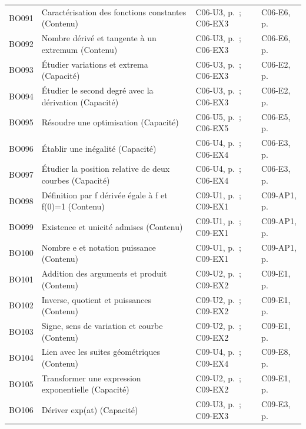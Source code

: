 \begin{longtable}{p{.1\linewidth}p{.43\linewidth}p{.19\linewidth}p{.16\linewidth}}
BO091 & Caractérisation des fonctions constantes (Contenu) & C06-U3, p.\,\pageref{C06-U3} ; C06-EX3 & C06-E6, p.\,\pageref{C06-E6} \\
BO092 & Nombre dérivé et tangente à un extremum (Contenu) & C06-U3, p.\,\pageref{C06-U3} ; C06-EX3 & C06-E6, p.\,\pageref{C06-E6} \\
BO093 & Étudier variations et extrema (Capacité) & C06-U3, p.\,\pageref{C06-U3} ; C06-EX3 & C06-E2, p.\,\pageref{C06-E2} \\
BO094 & Étudier le second degré avec la dérivation (Capacité) & C06-U3, p.\,\pageref{C06-U3} ; C06-EX3 & C06-E2, p.\,\pageref{C06-E2} \\
BO095 & Résoudre une optimisation (Capacité) & C06-U5, p.\,\pageref{C06-U5} ; C06-EX5 & C06-E5, p.\,\pageref{C06-E5} \\
BO096 & Établir une inégalité (Capacité) & C06-U4, p.\,\pageref{C06-U4} ; C06-EX4 & C06-E3, p.\,\pageref{C06-E3} \\
BO097 & Étudier la position relative de deux courbes (Capacité) & C06-U4, p.\,\pageref{C06-U4} ; C06-EX4 & C06-E3, p.\,\pageref{C06-E3} \\
BO098 & Définition par f dérivée égale à f et f(0)=1 (Contenu) & C09-U1, p.\,\pageref{C09-U1} ; C09-EX1 & C09-AP1, p.\,\pageref{C09-AP1} \\
BO099 & Existence et unicité admises (Contenu) & C09-U1, p.\,\pageref{C09-U1} ; C09-EX1 & C09-AP1, p.\,\pageref{C09-AP1} \\
BO100 & Nombre e et notation puissance (Contenu) & C09-U1, p.\,\pageref{C09-U1} ; C09-EX1 & C09-AP1, p.\,\pageref{C09-AP1} \\
BO101 & Addition des arguments et produit (Contenu) & C09-U2, p.\,\pageref{C09-U2} ; C09-EX2 & C09-E1, p.\,\pageref{C09-E1} \\
BO102 & Inverse, quotient et puissances (Contenu) & C09-U2, p.\,\pageref{C09-U2} ; C09-EX2 & C09-E1, p.\,\pageref{C09-E1} \\
BO103 & Signe, sens de variation et courbe (Contenu) & C09-U2, p.\,\pageref{C09-U2} ; C09-EX2 & C09-E1, p.\,\pageref{C09-E1} \\
BO104 & Lien avec les suites géométriques (Contenu) & C09-U4, p.\,\pageref{C09-U4} ; C09-EX4 & C09-E8, p.\,\pageref{C09-E8} \\
BO105 & Transformer une expression exponentielle (Capacité) & C09-U2, p.\,\pageref{C09-U2} ; C09-EX2 & C09-E1, p.\,\pageref{C09-E1} \\
BO106 & Dériver exp(at) (Capacité) & C09-U3, p.\,\pageref{C09-U3} ; C09-EX3 & C09-E3, p.\,\pageref{C09-E3} \\

\end{longtable}
